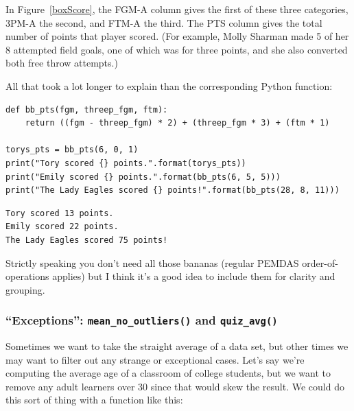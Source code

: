 In Figure~\ref{boxScore}, the \textsf{FGM-A} column gives the first of these
three categories, \textsf{3PM-A} the second, and \textsf{FTM-A} the third. The
\textsf{PTS} column gives the total number of points that player scored. (For
example, Molly Sharman made 5 of her 8 attempted field goals, one of which was
for three points, and she also converted both free throw attempts.)

All that took a lot longer to explain than the corresponding Python function:


\begin{Verbatim}[fontsize=\small,samepage=true,frame=single,framesep=3mm]
def bb_pts(fgm, threep_fgm, ftm):
    return ((fgm - threep_fgm) * 2) + (threep_fgm * 3) + (ftm * 1)

torys_pts = bb_pts(6, 0, 1)
print("Tory scored {} points.".format(torys_pts))
print("Emily scored {} points.".format(bb_pts(6, 5, 5)))
print("The Lady Eagles scored {} points!".format(bb_pts(28, 8, 11)))
\end{Verbatim}
\vspace{-.2in}

\begin{Verbatim}[fontsize=\small,samepage=true,frame=leftline,framesep=5mm,framerule=1mm]
Tory scored 13 points.
Emily scored 22 points.
The Lady Eagles scored 75 points!
\end{Verbatim}


Strictly speaking you don't need all those bananas (regular PEMDAS
order-of-operations applies) but I think it's a good idea to include them for
clarity and grouping.

\subsubsection{``Exceptions'': \texttt{mean\_no\_outliers()} and \texttt{quiz\_avg()}}

Sometimes we want to take the straight average of a data set, but other times
we may want to filter out any strange or exceptional cases. Let's say we're
computing the average age of a classroom of college students, but we want to
remove any adult learners over 30 since that would skew the result. We could do
this sort of thing with a function like this:


